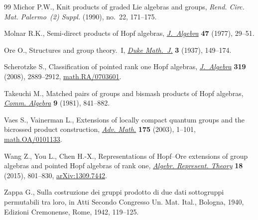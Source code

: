 \documentclass[10pt,a4paper]{amsart}
\numberwithin{equation}{section}
\begin{document}
\begin{thebibliography}{99}
Michor P.W., Knit products of graded {L}ie algebras and groups, \textit{Rend. Circ. Mat. Palermo~(2) Suppl.} (1990),
 no.~22, 171--175.

Molnar R.K., Semi-direct products of {H}opf algebras, \href{https://doi.org/10.1016/0021-8693(77)90208-3}{\textit{J.~Algebra}}
 \textbf{47} (1977), 29--51.

Ore O., Structures and group theory.~{I}, \href{https://doi.org/10.1215/S0012-7094-37-00311-9}{\textit{Duke Math.~J.}} \textbf{3}
 (1937), 149--174.

Scherotzke S., Classification of pointed rank one {H}opf algebras,
 \href{https://doi.org/10.1016/j.jalgebra.2008.01.028}{\textit{J.~Algebra}} \textbf{319} (2008), 2889--2912,
 \href{https://arxiv.org/abs/math.RA/0703601}{math.RA/0703601}.

Takeuchi M., Matched pairs of groups and bismash products of {H}opf algebras,
 \href{https://doi.org/10.1080/00927878108822621}{\textit{Comm. Algebra}} \textbf{9} (1981), 841--882.

Vaes S., Vainerman L., Extensions of locally compact quantum groups and the
 bicrossed product construction, \href{https://doi.org/10.1016/S0001-8708(02)00040-3}{\textit{Adv. Math.}} \textbf{175} (2003),
 1--101, \href{https://arxiv.org/abs/math.OA/0101133}{math.OA/0101133}.

Wang Z., You L., Chen H.-X., Representations of {H}opf--{O}re extensions of
 group algebras and pointed {H}opf algebras of rank one, \href{https://doi.org/10.1007/s10468-015-9517-z}{\textit{Algebr.
 Represent. Theory}} \textbf{18} (2015), 801--830, \href{https://arxiv.org/abs/1309.7442}{arXiv:1309.7442}.

Zappa G., Sulla costruzione dei gruppi prodotto di due dati sottogruppi
 permutabili tra loro, in Atti {S}econdo {C}ongresso {U}n. {M}at. {I}tal.,
 {B}ologna, 1940, Edizioni Cremonense, Rome, 1942, 119--125.

\end{thebibliography}
\end{document}
